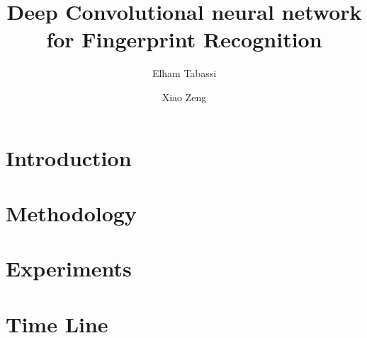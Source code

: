 \documentclass[10pt,twocolumn,letterpaper]{article}
\begin{document}
\title{Deep Convolutional neural network for Fingerprint Recognition}

\author{Elham Tabassi \and Xiao Zeng \\}

\maketitle


%

\section{Introduction}




%



\section{Methodology}

%



\section{Experiments}






\section{Time Line}






{\small


}
\end{document}
